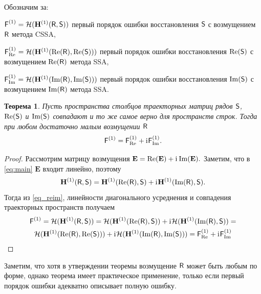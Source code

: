 \documentclass[specialist,
               substylefile = spbu.rtx,
               subf,href,colorlinks=true, 12pt]{disser}
\newtheorem{theorem}{Теорема}
\newtheorem*{notice*}{Замечание}
\begin{document}
Обозначим за:

$\textsf{F}^{(1)} = \mathcal{H}(\mathbf{H}^{(1)}(\textsf{R}, \textsf{S}))$ первый порядок ошибки восстановления $\textsf{S}$ с возмущением $\textsf{R}$ метода CSSA,

$\textsf{F}^{(1)}_{\Re} = \mathcal{H}(\mathbf{H}^{(1)}(\Re(\textsf{R}), \Re(\textsf{S})))$ первый порядок ошибки восстановления $\Re(\textsf{S})$ с возмущением $\Re(\textsf{R})$ метода SSA,

$\textsf{F}^{(1)}_{\Im} = \mathcal{H}(\mathbf{H}^{(1)}(\Im(\textsf{R}), \Im(\textsf{S})))$ первый порядок ошибки восстановления $\Im(\textsf{S})$ с возмущением $\Im(\textsf{R})$ метода SSA.


\begin{theorem}\label{th:sum}
	Пусть пространства столбцов траекторных матриц рядов $\textsf{S}$, $\Re(\textsf{S})$ и $\Im(\textsf{S})$ совпадают и то же самое верно для пространств строк.
	Тогда при любом достаточно малым возмущении $\textsf{R}$ $$\textsf{F}^{(1)} = \textsf{F}^{(1)}_{\Re} + \mathrm{i}\mkern1mu\textsf{F}^{(1)}_{\Im}.$$
\end{theorem}
\begin{proof}
	Рассмотрим матрицу возмущения $\mathbf{E} = \Re(\mathbf{E}) + \mathrm{i}\mkern1mu\Im(\mathbf{E}).$
	Заметим, что в \eqref{eq:main} $\mathbf{E}$ входит линейно, поэтому
	\begin{equation} \label{eq_reim}
		\mathbf{H}^{(1)}(\textsf{R}, \textsf{S}) = \mathbf{H}^{(1)}(\Re(\textsf{R}), \textsf{S}) + \mathrm{i}\mkern1mu\mathbf{H}^{(1)}(\Im(\textsf{R}), \textsf{S}).
	\end{equation}
	Тогда из \eqref{eq_reim}, линейности диагонального усреднения и  совпадения траекторных пространств получаем
	\begin{multline*}
		\textsf{F}^{(1)} = \mathcal{H}(\mathbf{H}^{(1)}(\textsf{R}, \textsf{S})) = \mathcal{H}(\mathbf{H}^{(1)}(\Re(\textsf{R}), \textsf{S})) + \mathrm{i}\mkern1mu\mathcal{H}(\mathbf{H}^{(1)}(\Im(\textsf{R}), \textsf{S})) =\\
		\mathcal{H}(\mathbf{H}^{(1)}(\Re(\textsf{R}), \Re(\textsf{S}))) + \mathrm{i}\mkern1mu\mathcal{H}(\mathbf{H}^{(1)}(\Im(\textsf{R}), \Im(\textsf{S}))) = \textsf{F}^{(1)}_{\Re} + \mathrm{i}\mkern1mu\textsf{F}^{(1)}_{\Im}	
	\end{multline*}
	
\end{proof}

Заметим, что хотя в утверждении теоремы возмущение $\textsf{R}$ может быть любым по форме, однако теорема имеет практическое применение, только если первый порядок ошибки адекватно описывает полную ошибку.

\end{document}
